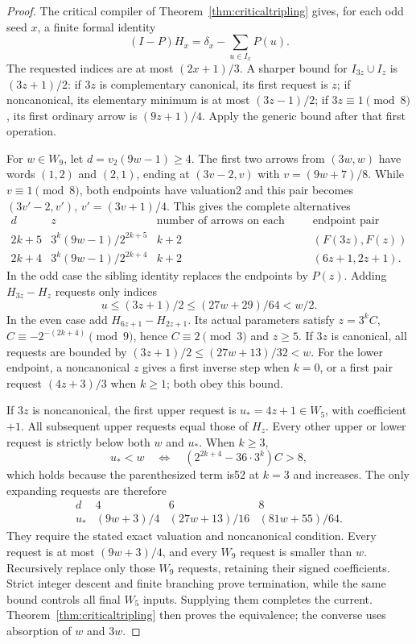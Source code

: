 \documentclass[11pt]{article}
\begin{document}
\begin{proof}
The critical compiler of Theorem~\ref{thm:criticaltripling} gives, for
each odd seed $x$, a finite formal identity
\[
 (I-P)H_x=\delta_x-\sum_{u\in I_x}P(u).
\]
The requested indices are at most $(2x+1)/3$. A sharper bound for
$I_{3z}\cup I_z$ is $(3z+1)/2$: if $3z$ is complementary canonical,
its first request is $z$; if noncanonical, its elementary minimum is
at most $(3z-1)/2$; if $3z\equiv1\pmod8$, its first ordinary arrow
is $(9z+1)/4$. Apply the generic bound after that first operation.

For $w\in W_9$, let $d=v_2(9w-1)\ge4$. The first two arrows from
$(3w,w)$ have words $(1,2)$ and $(2,1)$, ending at
$(3v-2,v)$ with $v=(9w+7)/8$. While $v\equiv1\pmod8$, both endpoints
have valuation2 and this pair becomes $(3v'-2,v')$, $v'=(3v+1)/4$.
This gives the complete alternatives
\[
\begin{array}{c|c|c|c}
 d&z&\text{number of arrows on each side}&\text{endpoint pair}\\\hline
 2k+5&3^k(9w-1)/2^{2k+5}&k+2&(F(3z),F(z))\\
 2k+4&3^k(9w-1)/2^{2k+4}&k+2&(6z+1,2z+1).
\end{array}
\]
In the odd case the sibling identity replaces the endpoints by $P(z)$.
Adding $H_{3z}-H_z$ requests only indices
\[
 u\le(3z+1)/2\le(27w+29)/64<w/2.
\]
In the even case add $H_{6z+1}-H_{2z+1}$. Its actual parameters satisfy
$z=3^kC$, $C\equiv-2^{-(2k+4)}\pmod9$, hence $C\equiv2\pmod3$
and $z\ge5$. If $3z$ is canonical, all requests are bounded by
$(3z+1)/2\le(27w+13)/32<w$. For the lower endpoint, a noncanonical
$z$ gives a first inverse step when $k=0$, or a first pair request
$(4z+3)/3$ when $k\ge1$; both obey this bound.

If $3z$ is noncanonical, the first upper request is $u_*=4z+1\in W_5$,
with coefficient $+1$. All subsequent upper requests equal those of
$H_z$. Every other upper or lower request is strictly below both $w$
and $u_*$. When $k\ge3$,
\[
 u_*<w\quad\Longleftrightarrow\quad
 (2^{2k+4}-36\cdot3^k)C>8,
\]
which holds because the parenthesized term is52 at $k=3$ and increases.
The only expanding requests are therefore
\[
\begin{array}{c|ccc}
d&4&6&8\\\hline
u_*&(9w+3)/4&(27w+13)/16&(81w+55)/64.
\end{array}
\]
They require the stated exact valuation and noncanonical condition.
Every request is at most $(9w+3)/4$, and every $W_9$ request is smaller
than $w$. Recursively replace only those $W_9$ requests, retaining their
signed coefficients. Strict integer descent and finite branching prove
termination, while the same bound controls all final $W_5$ inputs.
Supplying them completes the current. Theorem~\ref{thm:criticaltripling}
then proves the equivalence; the converse uses absorption of $w$ and $3w$.
\end{proof}
\end{document}
